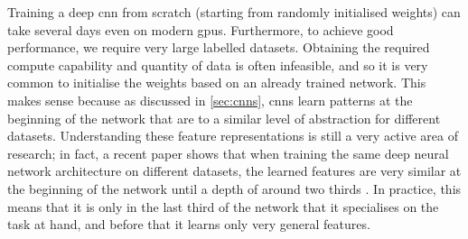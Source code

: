 \documentclass[../main.tex]{subfiles}
\begin{document}
Training a deep \gls{cnn} from scratch (starting from randomly initialised weights) can take several days even on modern \glspl{gpu}. 
Furthermore, to achieve good performance, we require very large labelled datasets.
Obtaining the required compute capability and quantity of data is often infeasible, and so it is very common to initialise the weights based on an already trained network.
This makes sense because as discussed in \cref{sec:cnns}, \glspl{cnn} learn patterns at the beginning of the network that are to a similar level of abstraction for different datasets.
Understanding these feature representations is still a very active area of research; in fact, a recent paper shows that when training the same deep neural network architecture on different datasets, the learned features are very similar at the beginning of the network until a depth of around two thirds \cite{kornblith2019}.
In practice, this means that it is only in the last third of the network that it specialises on the task at hand, and before that it learns only very general features.
\end{document}
